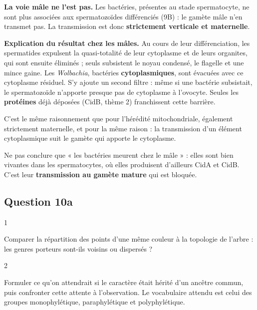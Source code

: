 \documentclass[11pt,a4paper]{article}
\begin{document}
\textbf{La voie mâle ne l'est pas.} Les bactéries, présentes au stade spermatocyte, ne sont plus associées aux spermatozoïdes différenciés (9B) : le gamète mâle n'en transmet pas. La transmission est donc \textbf{strictement verticale et maternelle}.

\textbf{Explication du résultat chez les mâles.} Au cours de leur différenciation, les spermatides expulsent la quasi-totalité de leur cytoplasme et de leurs organites, qui sont ensuite éliminés ; seuls subsistent le noyau condensé, le flagelle et une mince gaine. Les \emph{Wolbachia}, bactéries \textbf{cytoplasmiques}, sont évacuées avec ce cytoplasme résiduel. S'y ajoute un second filtre : même si une bactérie subsistait, le spermatozoïde n'apporte presque pas de cytoplasme à l'ovocyte. Seules les \textbf{protéines} déjà déposées (CidB, thème 2) franchissent cette barrière.

\begin{methode}

C'est le même raisonnement que pour l'hérédité mitochondriale, également strictement maternelle, et pour la même raison : la transmission d'un élément cytoplasmique suit le gamète qui apporte le cytoplasme.

\end{methode}

\begin{piege}

Ne pas conclure que « les bactéries meurent chez le mâle » : elles sont bien vivantes dans les spermatocytes, où elles produisent d'ailleurs CidA et CidB. C'est leur \textbf{transmission au gamète mature} qui est bloquée.

\end{piege}

\hypertarget{question-10a}{%
\subsection{Question 10a}\label{question-10a}}

\begin{indication}{1}

Comparer la répartition des points d'une même couleur à la topologie de l'arbre : les genres porteurs sont-ils voisins ou dispersés ?

\end{indication}

\begin{indication}{2}

Formuler ce qu'on attendrait si le caractère était hérité d'un ancêtre commun, puis confronter cette attente à l'observation. Le vocabulaire attendu est celui des groupes monophylétique, paraphylétique et polyphylétique.

\end{indication}
\end{document}
